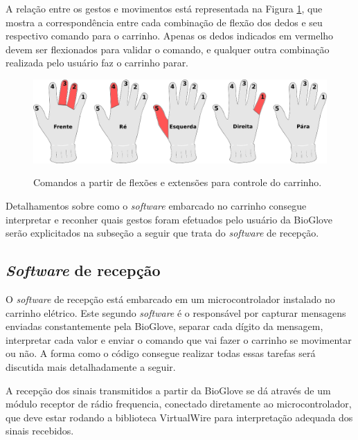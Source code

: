 \documentclass[
	12pt,				%
	openright,			%
	oneside,			%
	a4paper,			%
	english,			%
	brazil				%
	]{abntex2}
\begin{document}
		A relação entre os gestos e movimentos está representada na Figura \ref{Fig:glove-control-positions1}, que mostra a correspondência entre cada combinação de flexão dos dedos e seu respectivo comando para o carrinho. Apenas os dedos indicados em vermelho devem ser flexionados para validar o comando, e qualquer outra combinação realizada pelo usuário faz o carrinho parar.


		\begin{figure}[h!]
			\centering
			\caption{Comandos a partir de flexões e extensões para controle do carrinho.}
  		\includegraphics[width=14cm]{./figures/glove-control-positions1.png}
  		\label{Fig:glove-control-positions1}
		\end{figure}

		Detalhamentos sobre como o \textit{software} embarcado no carrinho consegue interpretar e reconher quais gestos foram efetuados pelo usuário da BioGlove serão explicitados na subseção a seguir que trata do \textit{software} de recepção.	

		
		\subsection{\textit{Software} de recepção}


		 O \textit{software} de recepção está embarcado em um microcontrolador instalado no carrinho elétrico. Este segundo \textit{software} é o responsável por capturar mensagens enviadas constantemente pela BioGlove, separar cada dígito da mensagem, interpretar cada valor e enviar o comando que vai fazer o carrinho se movimentar ou não. A forma como o código consegue realizar todas essas tarefas será discutida mais detalhadamente a seguir.
		
		A recepção dos sinais transmitidos a partir da BioGlove se dá através de um módulo receptor de rádio frequencia, conectado diretamente ao microcontrolador, que deve estar rodando a biblioteca VirtualWire para interpretação adequada dos sinais recebidos.
\end{document}

